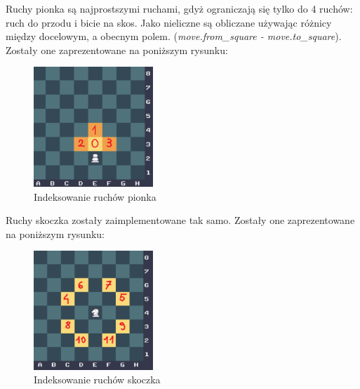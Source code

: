 Ruchy pionka są najprostszymi ruchami, gdyż ograniczają się tylko do 4 ruchów: ruch do przodu i bicie na skos. Jako nieliczne są obliczane używając różnicy między docelowym, a obecnym polem. (\textit{move.from\_square - move.to\_square}). Zostały one zaprezentowane na poniższym rysunku:
\begin{figure}[!h]
\centering
\includegraphics[width=0.4\textwidth]{images/pawn_moves.png}
\caption{Indeksowanie ruchów pionka}
\end{figure}

Ruchy skoczka zostały zaimplementowane tak samo. Zostały one zaprezentowane na poniższym rysunku:

\begin{figure}[!h]
\centering
\includegraphics[width=0.4\textwidth]{images/knight_moves.png}
\caption{Indeksowanie ruchów skoczka}
\end{figure}

